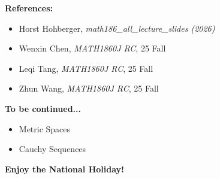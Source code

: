 \documentclass[dvipsnames]{beamer}
\theoremstyle{plain}
\theoremstyle{definition}
\begin{document}

\begin{frame}
\large \textbf{References:}
\vspace{0.5em}
\begin{itemize}
  \item Horst Hohberger, \textit{math186\_all\_lecture\_slides (2026)}
  \item Wenxin Chen, \textit{MATH1860J RC}, 25 Fall
  \item Leqi Tang, \textit{MATH1860J RC}, 25 Fall
  \item Zhun Wang, \textit{MATH1860J RC}, 25 Fall
\end{itemize}
\vspace{0.7cm}
\large \textbf{To be continued...} \\
\vspace{0.5em}
\begin{itemize}
    \item Metric Spaces
    \item Cauchy Sequences
\end{itemize}
\vspace{0.7cm}
\huge \textbf{Enjoy the National Holiday!}
\end{frame}
\end{document}
